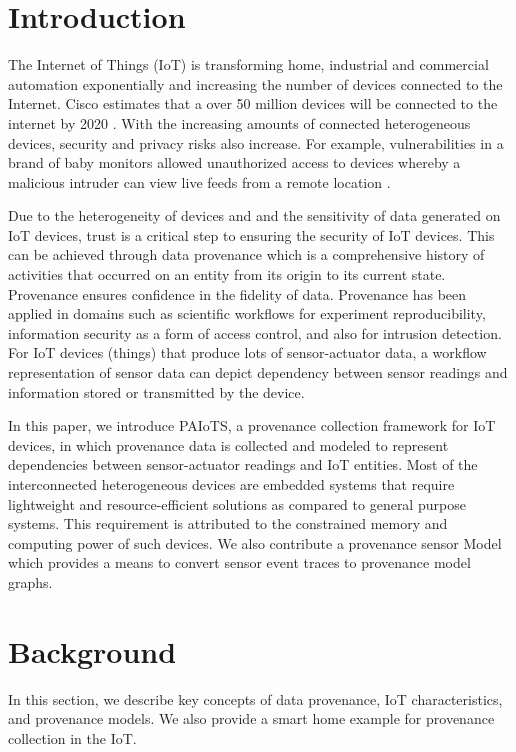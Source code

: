 \documentclass[conference]{IEEEtran}
\begin{document}
\section{Introduction}
The Internet of Things (IoT) is transforming home, industrial and commercial automation exponentially and increasing the number of devices connected to the Internet. Cisco estimates that a over 50 million devices will be connected to the internet by 2020 \cite{dave}. With the increasing amounts of connected heterogeneous devices, security and privacy risks also increase. For example, vulnerabilities in a brand of baby monitors allowed unauthorized access to devices whereby a malicious intruder can view live feeds from a remote location \cite{rapid7}. 

\par Due to the heterogeneity of devices and and the sensitivity of data generated on IoT devices, trust is a critical step to ensuring the security of IoT devices. This can be achieved through data provenance which is a comprehensive history of activities that occurred on an entity from its origin to its current state. Provenance ensures confidence in the fidelity of data. Provenance has been applied in domains such as scientific workflows for experiment reproducibility, information security as a form of access control, and also for intrusion detection. For IoT devices (things) that produce lots of sensor-actuator data, a workflow representation of sensor data can depict dependency between sensor readings and information stored or transmitted by the device. 

\par In this paper, we introduce PAIoTS, a provenance collection framework for IoT devices, in which provenance data is collected and modeled to represent dependencies between sensor-actuator readings and IoT entities. Most of the interconnected heterogeneous devices are embedded systems that require lightweight and resource-efficient solutions as compared to general purpose
systems. This requirement is attributed to the constrained memory and computing power of such devices. We also contribute a provenance sensor Model which provides a means to convert sensor event traces to provenance model graphs.



\section{Background} 
In this section, we  describe key concepts of data provenance, IoT characteristics, and provenance models. We also provide a smart home example for provenance collection in the IoT.
\end{document}
